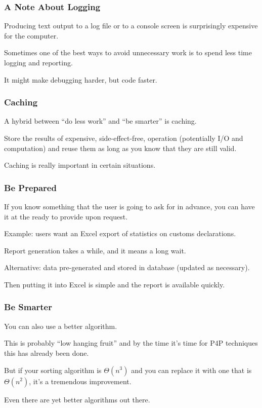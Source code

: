 \begin{frame}
\frametitle{A Note About Logging}

Producing text output to a log file or to a console screen is surprisingly expensive for the computer. 

Sometimes one of the best ways to avoid unnecessary work is to spend less time logging and reporting. 

It might make debugging harder, but code faster.

\end{frame}

\begin{frame}
\frametitle{Caching}

A hybrid between ``do less work'' and ``be smarter'' is caching. 

Store the results of expensive, side-effect-free, operation
(potentially I/O and computation) and reuse them as long as you
know that they are still valid. 

Caching is really important in certain situations.


\end{frame}




\begin{frame}
\frametitle{Be Prepared}

If you know something that the user is going to ask for in advance, you can have it at the ready to provide upon request. 

Example: users want an Excel export of statistics on customs declarations. 

Report generation takes a while, and it means a long wait. 

Alternative: data pre-generated and stored in database (updated as necessary).

Then putting it into Excel is simple and the report is available quickly.


\end{frame}



\begin{frame}
\frametitle{Be Smarter}

You can also use a better algorithm. 

This is probably ``low hanging fruit'' and by the time it's time for P4P techniques this has already been done. 

But if your sorting algorithm is $\Theta(n^{3})$ and you can replace it with one that is $\Theta(n^{2})$, it's a tremendous improvement.

Even there are yet better algorithms out there.


\end{frame}




